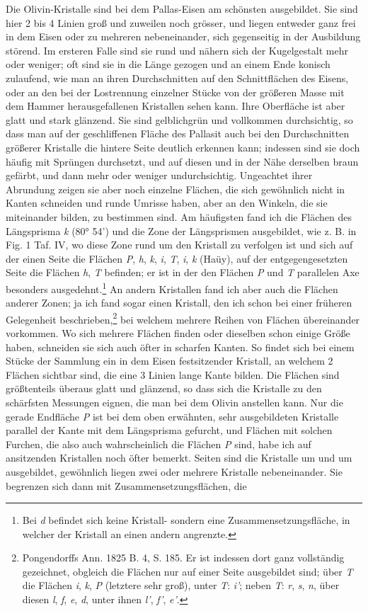 \documentclass[a4paper, 11pt, oneside]{article}
\begin{document}
Die Olivin-Kristalle sind bei dem Pallas-Eisen am schönsten ausgebildet. Sie sind hier 2 bis 4 Linien groß und zuweilen noch grösser, und liegen entweder ganz frei in dem Eisen oder zu mehreren nebeneinander, sich gegenseitig in der Ausbildung störend. Im ersteren Falle sind sie rund und nähern sich der Kugelgestalt mehr oder weniger; oft sind sie in die Länge gezogen und an einem Ende konisch zulaufend, wie man an ihren Durchschnitten auf den Schnittflächen des Eisens, oder an den bei der Lostrennung einzelner Stücke von der größeren Masse mit dem Hammer herausgefallenen Kristallen sehen kann. Ihre Oberfläche ist aber glatt und stark glänzend. Sie sind gelblichgrün und vollkommen durchsichtig, so dass man auf der geschliffenen Fläche des Pallasit auch bei den Durchschnitten größerer Kristalle die hintere Seite deutlich erkennen kann; indessen sind sie doch häufig mit Sprüngen durchsetzt, und auf diesen und in der Nähe derselben braun gefärbt, und dann mehr oder weniger undurchsichtig. Ungeachtet ihrer Abrundung zeigen sie aber noch einzelne Flächen, die sich gewöhnlich nicht in Kanten schneiden und runde Umrisse haben, aber an den Winkeln, die sie miteinander bilden, zu bestimmen sind. Am häufigsten fand ich die Flächen des Längsprisma \emph{k} (80° 54’) und die Zone der Längsprismen ausgebildet, wie z. B. in Fig. 1 Taf. IV, wo diese Zone rund um den Kristall zu verfolgen ist und sich auf der einen Seite die Flächen \emph{P}, \emph{h}, \emph{k}, \emph{i}, \emph{T}, \emph{i}, \emph{k} (Haüy), auf der entgegengesetzten Seite die Flächen \emph{h}, \emph{T} befinden; er ist in der den Flächen \emph{P} und \emph{T} parallelen Axe besonders ausgedehnt.\footnote{Bei \emph{d} befindet sich keine Kristall- sondern eine Zusammensetzungsfläche, in welcher der Kristall an einen andern angrenzte.} An andern Kristallen fand ich aber auch die Flächen anderer Zonen; ja ich fand sogar einen Kristall, den ich schon bei einer früheren Gelegenheit beschrieben,\footnote{Pongendorffs Ann. 1825 B. 4, S. 185. Er ist indessen dort ganz vollständig gezeichnet, obgleich die Flächen nur auf einer Seite ausgebildet sind; über \emph{T} die Flächen \emph{i}, \emph{k}, \emph{P} (letztere sehr groß), unter \emph{T}: \emph{i'}; neben \emph{T}: \emph{r}, \emph{s}, \emph{n}, über diesen \emph{l}, \emph{f}, \emph{e}, \emph{d}, unter ihnen \emph{l'}, \emph{f'}, \emph{e'}.} bei welchem mehrere Reihen von Flächen übereinander vorkommen. Wo sich mehrere Flächen finden oder dieselben schon einige Größe haben, schneiden sie sich auch öfter in scharfen Kanten. So findet sich bei einem Stücke der Sammlung ein in dem Eisen festsitzender Kristall, an welchem 2 Flächen sichtbar sind, die eine 3 Linien lange Kante bilden. Die Flächen sind größtenteils überaus glatt und glänzend, so dass sich die Kristalle zu den schärfsten Messungen eignen, die man bei dem Olivin anstellen kann. Nur die gerade Endfläche \emph{P} ist bei dem oben erwähnten, sehr ausgebildeten Kristalle parallel der Kante mit dem Längsprisma gefurcht, und Flächen mit solchen Furchen, die also auch wahrscheinlich die Flächen \emph{P} sind, habe ich auf ansitzenden Kristallen noch öfter bemerkt. Seiten sind die Kristalle um und um ausgebildet, gewöhnlich liegen zwei oder mehrere Kristalle nebeneinander. Sie begrenzen sich dann mit Zusammensetzungsflächen, die 
\end{document}
